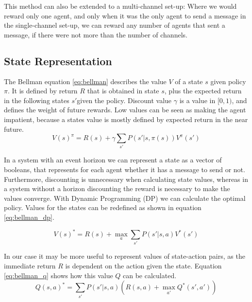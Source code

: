 \documentclass{article}
\begin{document}
\begin{multicols}{2}
		This method can also be extended to a multi-channel set-up: Where we
		would reward only one agent, and only when it was the only agent to send a
		message in the single-channel set-up, we can reward any number of agents
		that sent a message, if there were not more than the number of channels.

		\subsection{State Representation}
		\label{sub:state_representation}
		The Bellman equation \ref{eq:bellman} describes the value $V$ of a state
		$s$ given policy $\pi$. It is defined by return $R$ that is obtained in
		state $s$, plus the expected return in the following states $s'$given the
		policy. Discount value $\gamma$ is a value in $[0, 1)$, and defines the
		weight of future rewards. Low values can be seen as making the agent
		impatient, because a states value is mostly defined by expected return in
		the near future.
		\begin{equation}
		\displaystyle
		V(s)^\pi = R(s) + \gamma\sum_{s'} P(s'|s, \pi(s)) V^\pi(s')
		\label{eq:bellman}
		\end{equation}

		In a system with an event horizon we can represent a state as a vector of
		booleans, that represents for each agent whether it has a message to send
		or not. Furthermore, discounting is unnecessary when calculating state
		values, whereas in a system without a horizon discounting the reward is
		necessary to make the values converge. With Dynamic Programming (DP) we
		can calculate the optimal policy. Values for the states can be redefined
		as shown in equation \ref{eq:bellman_dp}.

		\begin{equation}
		\displaystyle
		V(s)^* = R(s) + \max_a \sum_{s'} P(s'|s, a) V^*(s')
		\label{eq:bellman_dp}
		\end{equation}

		In our case it may be more useful to represent values of state-action
		pairs, as the immediate return $R$ is dependent on the action given the
		state. Equation \ref{eq:bellman_q} shows how this value $Q$ can be
		calculated.
		\begin{equation}
		\displaystyle
		Q(s, a)^* = \sum_{s'} P(s'|s, a) \left(R(s, a) + \max_{a'} Q^*(s', a')\right)
		\label{eq:bellman_q}
		\end{equation}


\end{multicols}
\end{document}
